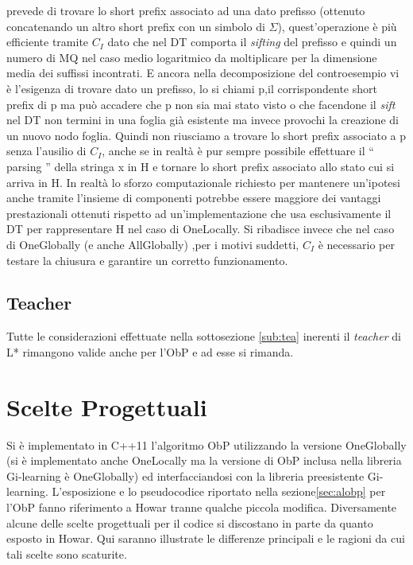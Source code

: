 prevede di trovare lo short prefix associato ad una dato prefisso (ottenuto concatenando un altro short prefix con un simbolo di $\Sigma$), quest'operazione è più efficiente tramite $C_{I}$ dato che nel \ac{DT} comporta il \textit{sifting} del prefisso e quindi un numero di \ac{MQ} nel caso medio logaritmico  da moltiplicare per la dimensione media dei suffissi incontrati. E ancora nella decomposizione del controesempio vi è l'esigenza di trovare dato un prefisso, lo si chiami p,il corrispondente short prefix di p ma può accadere che p non sia mai stato visto o che facendone il \textit{sift} nel \ac{DT} non termini in una foglia già esistente ma invece provochi la creazione di un nuovo nodo foglia. Quindi non riusciamo a trovare lo short prefix associato a p senza l'ausilio di $C_I$, anche se in realtà è pur sempre possibile effettuare il  `` parsing  '' della stringa x in \ac{H} e tornare lo short prefix associato allo stato cui si arriva in \ac{H}. In realtà lo sforzo computazionale richiesto per mantenere un'ipotesi anche tramite l'insieme di componenti potrebbe essere maggiore dei vantaggi prestazionali ottenuti rispetto ad un'implementazione che usa esclusivamente il \ac{DT} per rappresentare \ac{H} nel caso di OneLocally. Si ribadisce invece che nel caso di OneGlobally  (e anche AllGlobally) ,per i motivi suddetti, $C_I$ è necessario per testare la chiusura e garantire un corretto funzionamento.
\subsection{Teacher} Tutte le considerazioni effettuate nella sottosezione \ref{sub:tea} inerenti il \textit{teacher} di L* rimangono valide anche per l'\ac{ObP} e ad esse si rimanda.  
 
\section{Scelte Progettuali} Si è implementato in C++11 l'algoritmo \ac{ObP} utilizzando la versione OneGlobally (si è implementato anche OneLocally ma la versione di \ac{ObP} inclusa nella libreria Gi-learning è OneGlobally) ed interfacciandosi con la libreria preesistente Gi-learning. L'esposizione e lo pseudocodice riportato nella sezione\ref{sec:alobp} per l'\ac{ObP} fanno riferimento a Howar \cite{Howar12} tranne qualche piccola modifica. Diversamente alcune delle scelte   progettuali per il codice  si discostano in parte da quanto esposto in Howar. Qui saranno illustrate le differenze principali e le ragioni da cui tali scelte sono scaturite.

